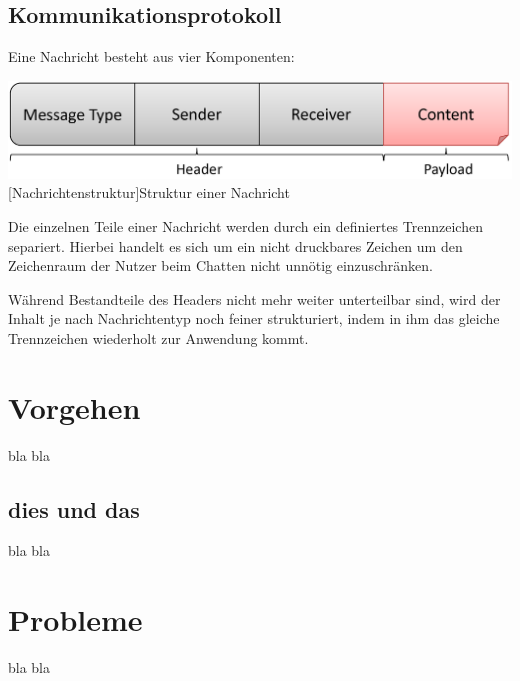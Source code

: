 \documentclass[12pt,a4paper,bibliography=totocnumbered,listof=totocnumbered]{scrartcl}
\begin{document}
\subsection{Kommunikationsprotokoll}
Eine Nachricht besteht aus vier Komponenten:

\vspace{1em}
\begin{minipage}{\linewidth}
	\centering
	\includegraphics[width=0.7\linewidth]{img/Nachrichtenstruktur.png}
	[Nachrichtenstruktur]{Struktur einer Nachricht}
	\label{fig:Nachrichtenstruktur}
\end{minipage}
\vspace{0.5em}

Die einzelnen Teile einer Nachricht werden durch ein definiertes Trennzeichen separiert. Hierbei handelt es sich um ein nicht druckbares Zeichen um den Zeichenraum der Nutzer beim Chatten nicht unnötig einzuschränken.

Während Bestandteile des Headers nicht mehr weiter unterteilbar sind, wird der Inhalt je nach Nachrichtentyp noch feiner strukturiert, indem in ihm das gleiche Trennzeichen wiederholt zur Anwendung kommt.

\section{Vorgehen}
bla bla

\subsection{dies und das}
bla bla

\section{Probleme}
bla bla
\end{document}

